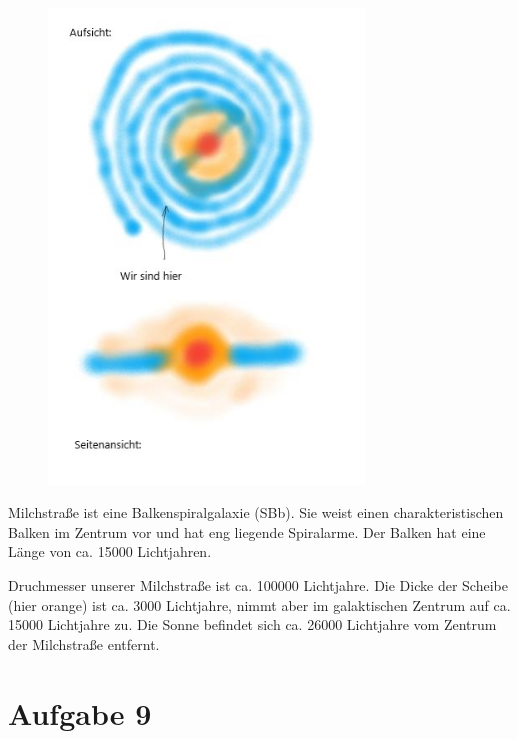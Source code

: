 \begin{figure}[H]
    \centering
    \includegraphics[width=0.75\textwidth]{images/Aufgabe8c_skizze.jpg}
    \label{fig:5}
\end{figure}

    \justifying Milchstraße ist eine Balkenspiralgalaxie (SBb). Sie weist einen charakteristischen Balken im Zentrum vor und hat eng
    liegende Spiralarme. Der Balken hat eine Länge von ca. 15000 Lichtjahren.

    \justifying Druchmesser unserer Milchstraße ist ca. 100000 Lichtjahre. Die Dicke der Scheibe (hier orange) ist ca. 3000
    Lichtjahre, nimmt aber im galaktischen Zentrum auf ca. 15000 Lichtjahre zu. Die Sonne befindet sich ca. 26000 Lichtjahre vom Zentrum der
    Milchstraße entfernt. 

\section{Aufgabe 9}

